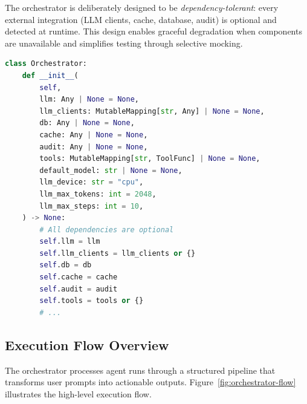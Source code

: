 \documentclass[a4paper,twoside]{sapthesis}
\begin{document}
The orchestrator is deliberately designed to be \emph{dependency-tolerant}: every external integration (LLM clients, cache, database, audit) is optional and detected at runtime. This design enables graceful degradation when components are unavailable and simplifies testing through selective mocking.

\begin{lstlisting}[language=Python, caption={Orchestrator class initialization showing dependency tolerance}, label=lst:orchestrator-init]
class Orchestrator:
    def __init__(
        self,
        llm: Any | None = None,
        llm_clients: MutableMapping[str, Any] | None = None,
        db: Any | None = None,
        cache: Any | None = None,
        audit: Any | None = None,
        tools: MutableMapping[str, ToolFunc] | None = None,
        default_model: str | None = None,
        llm_device: str = "cpu",
        llm_max_tokens: int = 2048,
        llm_max_steps: int = 10,
    ) -> None:
        # All dependencies are optional
        self.llm = llm
        self.llm_clients = llm_clients or {}
        self.db = db
        self.cache = cache
        self.audit = audit
        self.tools = tools or {}
        # ...
\end{lstlisting}

\subsection{Execution Flow Overview}

The orchestrator processes agent runs through a structured pipeline that transforms user prompts into actionable outputs. Figure~\ref{fig:orchestrator-flow} illustrates the high-level execution flow.
\end{document}
